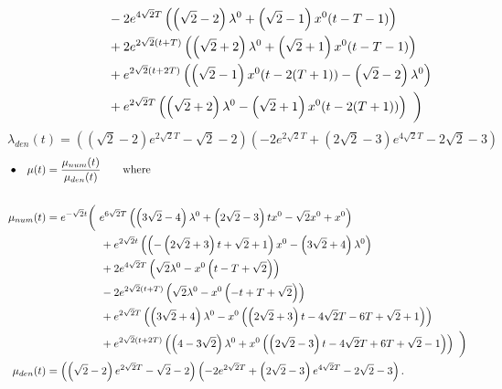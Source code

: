 \documentclass[11pt]{article}
\begin{document}
\begin{appendix}
\begin{subequations}
\begin{align}
           & \qquad \qquad \quad -2 e^{4 \sqrt{2} T} \left(\left(\sqrt{2}-2\right) \lambda^0+\left(\sqrt{2}-1\right) x^0 (t-T-1)\right) \notag\\
           & \qquad \qquad \quad +2 e^{2 \sqrt{2} (t+T)} \left(\left(\sqrt{2}+2\right) \lambda^0+\left(\sqrt{2}+1\right) x^0 (t-T-1)\right) \notag\\
           & \qquad \qquad \quad  +e^{2 \sqrt{2} (t+2 T)} \left(\left(\sqrt{2}-1\right) x^0 (t-2 (T+1))-\left(\sqrt{2}-2\right) \lambda^0\right) \notag\\
           & \qquad \qquad \quad +e^{2 \sqrt{2} T} \left(\left(\sqrt{2}+2\right) \lambda^0-\left(\sqrt{2}+1\right) x^0 (t-2 (T+1))\right) \ \bigg) \notag
    \end{align}
\end{subequations}
\begin{equation*}
    \lambda_{den}(t) = \left(\left(\sqrt{2}-2\right) e^{2 \sqrt{2} T}-\sqrt{2}-2\right) \left(-2 e^{2 \sqrt{2} T}+\left(2 \sqrt{2}-3\right) e^{4 \sqrt{2} T}-2 \sqrt{2}-3\right)
\end{equation*}
\begin{subequations}
\allowdisplaybreaks
    \begin{align}
    \bullet \quad \mu(t) & = \frac{\mu_{num}(t)}{\mu_{den}(t)} \qquad \mbox{where} \notag\\
    \notag \\
    \mu_{num}(t) & = e^{-\sqrt{2} t}\bigg( \ e^{6 \sqrt{2} T} \left(\left(3 \sqrt{2}-4\right) \lambda^0+\left(2 \sqrt{2}-3\right) t x^0-\sqrt{2} x^0+x^0\right) \notag\\
        & \qquad \qquad \quad +e^{2 \sqrt{2} t} \left(\left(-\left(2 \sqrt{2}+3\right) t+\sqrt{2}+1\right) x^0-\left(3 \sqrt{2}+4\right) \lambda^0\right) \notag\\
        & \qquad \qquad \quad +2 e^{4 \sqrt{2} T} \left(\sqrt{2} \lambda^0-x^0 \left(t-T+\sqrt{2}\right)\right) \notag\\
        & \qquad \qquad \quad -2 e^{2 \sqrt{2} (t+T)} \left(\sqrt{2} \lambda^0-x^0 \left(-t+T+\sqrt{2}\right)\right) \notag\\
        & \qquad \qquad \quad +e^{2 \sqrt{2} T} \left(\left(3 \sqrt{2}+4\right) \lambda^0-x^0 \left(\left(2 \sqrt{2}+3\right) t-4 \sqrt{2} T-6 T+\sqrt{2}+1\right)\right) \notag\\
        & \qquad \qquad \quad +e^{2 \sqrt{2} (t+2 T)} \left(\left(4-3 \sqrt{2}\right) \lambda^0+x^0 \left(\left(2 \sqrt{2}-3\right) t-4 \sqrt{2} T+6 T+\sqrt{2}-1\right)\right) \ \bigg) \notag\\
        \mu_{den}(t) & = \left(\left(\sqrt{2}-2\right) e^{2 \sqrt{2} T}-\sqrt{2}-2\right) \left(-2 e^{2 \sqrt{2} T}+\left(2 \sqrt{2}-3\right) e^{4 \sqrt{2} T}-2 \sqrt{2}-3\right). \notag
    \end{align}
\end{subequations}
\end{appendix}
\end{document}
